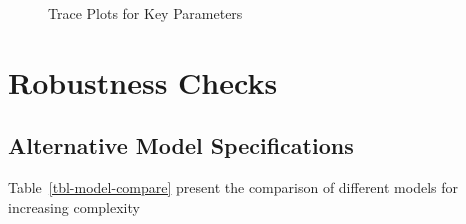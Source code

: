\documentclass[
  letterpaper,
  DIV=11,
  numbers=noendperiod]{scrartcl}
\begin{document}
\begin{figure}[H]


\caption{\label{fig-trace}Trace Plots for Key Parameters}

\end{figure}%

\section{Robustness Checks}\label{robustness-checks}

\subsection{Alternative Model
Specifications}\label{alternative-model-specifications}

Table~\ref{tbl-model-compare} present the comparison of different models
for increasing complexity
\end{document}
